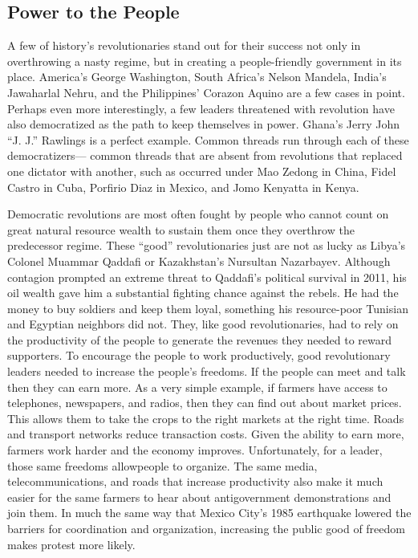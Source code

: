 \documentclass[10pt]{article}
\begin{document}
\subsection{Power to the People}

{\large A few of history's revolutionaries stand out for their success not only
in overthrowing a nasty regime, but in creating a people-friendly government in
its place. America's George Washington, South Africa's Nelson Mandela, India's
Jawaharlal Nehru, and the Philippines' Corazon Aquino are a few cases in point.
Perhaps even more interestingly, a few leaders threatened with revolution have
also democratized as the path to keep themselves in power. Ghana's Jerry John
``J. J.'' Rawlings is a perfect example. Common threads run through each of these
democratizers--- common threads that are absent from revolutions that replaced
one dictator with another, such as occurred under Mao Zedong in China, Fidel
Castro in Cuba, Porfirio Diaz in Mexico, and Jomo Kenyatta in Kenya.}

{\large Democratic revolutions are most often fought by people who cannot count
on great natural resource wealth to sustain them once they overthrow the
predecessor regime. These ``good'' revolutionaries just are not as lucky as
Libya's Colonel Muammar Qaddafi or Kazakhstan's Nursultan Nazarbayev. Although
contagion prompted an extreme threat to Qaddafi's political survival in 2011, his
oil wealth gave him a substantial fighting chance against the rebels. He had the
money to buy soldiers and keep them loyal, something his resource-poor Tunisian
and Egyptian neighbors did not. They, like good revolutionaries, had to rely on
the productivity of the people to generate the revenues they needed to reward
supporters. To encourage the people to work productively, good revolutionary
leaders needed to increase the people's freedoms. If the people can meet and talk
then they can earn more. As a very simple example, if farmers have access to
telephones, newspapers, and radios, then they can find out about market prices.
This allows them to take the crops to the right markets at the right time. Roads
and transport networks reduce transaction costs. Given the ability to earn more,
farmers work harder and the economy improves. Unfortunately, for a leader, those
same freedoms allowpeople to organize. The same media, telecommunications, and
roads that increase productivity also make it much easier for the same farmers to
hear about antigovernment demonstrations and join them. In much the same way that
Mexico City's 1985 earthquake lowered the barriers for coordination and
organization, increasing the public good of freedom makes protest more likely.}
\end{document}
